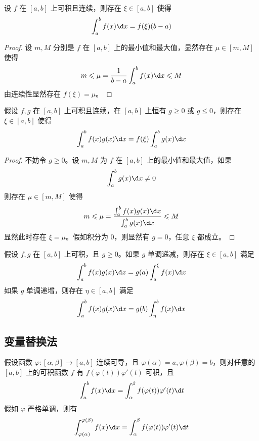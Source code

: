 \begin{theorem}[积分第一中值定理]
	设 $f$ 在 $[a,b]$ 上可积且连续，则存在 $\xi \in [a, b]$ 使得
	\[ \int_{a}^{b} f(x) \d x = f(\xi) (b-a) \]
\end{theorem}

\begin{proof}
	设 $m, M$ 分别是 $f$ 在 $[a,b]$ 上的最小值和最大值，显然存在 $\mu \in [m, M]$ 使得
	\[ m \leqslant \mu = \frac{1}{b-a}\int_{a}^{b} f(x) \d x \leqslant M \]
	由连续性显然存在 $f(\xi) = \mu$。
\end{proof}

\begin{theorem}[广义积分第一中值定理]
	假设 $f, g$ 在 $[a, b]$ 上可积且连续，在 $[a,b]$ 上恒有 $g \geqslant 0$ 或 $g \leqslant 0$，则存在 $\xi \in [a,b]$ 使得
	\[ \int_{a}^{b} f(x)g(x) \d x = f(\xi) \int_{a}^{b} g(x) \d x \]
\end{theorem}

\begin{proof}
	不妨令 $g \geqslant 0$。设 $m, M$ 为 $f$ 在 $[a, b]$ 上的最小值和最大值，如果
	\[ \int_{a}^{b} g(x) \d x \neq 0 \]
	则存在 $\mu \in [m, M]$ 使得
	\[ m \leqslant \mu = \frac{ \int_{a}^{b} f(x)g(x) \d x}{\int_{a}^{b} g(x) \d x} \leqslant M \]
	显然此时存在 $\xi = \mu$。假如积分为 $0$，则显然有 $g = 0$，任意 $\xi$ 都成立。
\end{proof}

\begin{theorem}[积分第二中值定理]
	假设 $f, g$ 在 $[a,b]$ 上可积，且 $g \geqslant 0$。如果 $g$ 单调递减，则存在 $\xi \in [a, b]$ 满足
	\[ \int_{a}^{b} f(x) g(x) \d x = g(a) \int_{a}^{\xi} f(x) \d x \]
	如果 $g$ 单调递增，则存在 $\eta \in [a, b]$ 满足
	\[ \int_{a}^{b} f(x) g(x) \d x = g(b) \int_{\eta}^{b} f(x) \d x \]
\end{theorem}

\subsection{变量替换法}

\begin{theorem}
	假设函数 $\varphi : [\alpha, \beta] \to [a, b]$ 连续可导，且 $\varphi(\alpha) = a, \varphi(\beta) = b$，则对任意的 $[a, b]$ 上的可积函数 $f$ 有 $f(\varphi(t))\varphi'(t)$ 可积，且
	\[ \int_{a}^{b} f(x) \d x = \int_{\alpha}^{\beta} f(\varphi(t)) \varphi'(t) \d t \]
	假如 $\varphi$ 严格单调，则有
	\[ \int_{\varphi(\alpha)}^{\varphi(\beta)} f(x) \d x = \int_{\alpha}^{\beta} f(\varphi(t)) \varphi'(t) \d t \]

\end{theorem}


